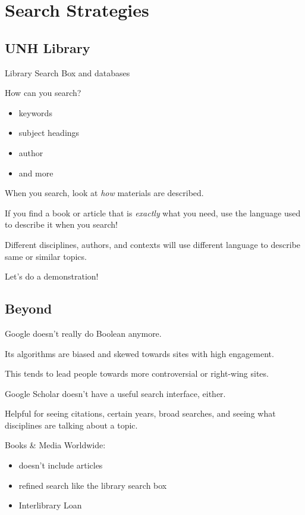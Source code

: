 \documentclass[11pt]{article}
\begin{document}
\section*{Search Strategies}
\label{sec:org063b1cb}

\subsection*{UNH Library}
\label{sec:org1f0a064}

Library Search Box and databases

How can you search?

\begin{itemize}
\item keywords
\item subject headings
\item author
\item and more
\end{itemize}

When you search, look at \emph{how} materials are described.

If you find a book or article that is \emph{exactly} what you need, use the language used to describe it when you search!

Different disciplines, authors, and contexts will use different language to describe same or similar topics.

Let's do a demonstration!

\subsection*{Beyond}
\label{sec:orga9bd75f}

Google doesn't really do Boolean anymore.

Its algorithms are biased and skewed towards sites with high engagement.

This tends to lead people towards more controversial or right-wing sites.

Google Scholar doesn't have a useful search interface, either.

Helpful for seeing citations, certain years, broad searches, and seeing what disciplines are talking about a topic.

Books \& Media Worldwide:

\begin{itemize}
\item doesn't include articles
\item refined search like the library search box
\item Interlibrary Loan
\end{itemize}
\end{document}
